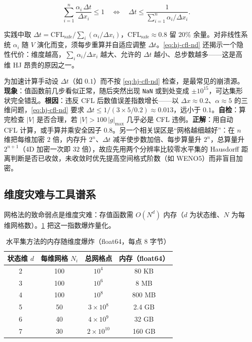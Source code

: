 \begin{equation}
  \boxed{\ \sum_{i=1}^{n}\frac{\alpha_i\,\Delta t}{\Delta x_i}\le1\quad\Longleftrightarrow\quad \Delta t\le\frac{1}{\sum_{i=1}^{n}\alpha_i/\Delta x_i}.\ }
  \label{eq:hj-cfl-nd}
\end{equation}

实践中取 $\Delta t=\mathrm{CFL}_{\mathrm{safe}}\big/\sum_i(\alpha_i/\Delta x_i)$，$\mathrm{CFL}_{\mathrm{safe}}\approx0.8$ 留 $20\%$ 余量。对非线性系统 $\alpha_i$ 随 $V$ 演化而变，须每步重算并自适应调整 $\Delta t$。\cref{eq:hj-cfl-nd} 还揭示一个隐性代价：维度越高，$\sum_i\alpha_i/\Delta x_i$ 越大、允许的 $\Delta t$ 越小、总步数越多——这是高维 HJ 昂贵的原因之一。

\begin{pitfall}
为加速计算手动设 $\Delta t$（如 $0.1$）而不按 \cref{eq:hj-cfl-nd} 检查，是最常见的崩溃源。\textbf{现象}：值函数前几步看似正常，随后突然出现 \texttt{NaN} 或到处变成 $\pm10^{15}$，可达集形状完全错乱。\textbf{根因}：违反 CFL 后数值误差指数增长——以 $\Delta x\approx0.2$、$\alpha\approx5$ 的三维问题，\cref{eq:hj-cfl-nd} 要求 $\Delta t\le1/(3\times5/0.2)\approx0.013$，远小于 $0.1$。\textbf{自检}：算完检查 $|V|$ 是否合理，若 $|V|>100\,|g|_{\max}$ 几乎必是 CFL 违例。\textbf{正解}：用自动 CFL 计算，或手算并乘安全因子 $0.8$。另一个相关误区是“网格越细越好”：在 $n$ 维把每维加密 $2$ 倍，内存升 $2^n$、$\Delta t$ 减半使步数加倍、每步算量升 $2^n$，总算量升 $2^{n+1}$（4D 加密一次即 $32$ 倍），故应先用两个分辨率比较零水平集的 Hausdorff 距离判断是否已收敛，未收敛时优先提高空间格式阶数（如 WENO5）而非盲目加密。
\end{pitfall}

\subsection{维度灾难与工具谱系}
\label{sec:hj-curse}

网格法的致命弱点是维度灾难：存值函数需 $O(N^d)$ 内存（$d$ 为状态维、$N$ 为每维网格数）。\cref{tab:hj-curse} 把这一指数爆炸量化。

\begin{table}[H]\centering\small
\caption{水平集方法的内存随维度爆炸（float64，每点 8 字节）}
\label{tab:hj-curse}
\begin{tabular}{cccc}
\toprule
状态维 $d$ & 每维网格 $N_i$ & 总网格点 & 内存（float64） \\
\midrule
2 & 100 & $10^{4}$ & 80 KB \\
3 & 100 & $10^{6}$ & 8 MB \\
4 & 100 & $10^{8}$ & 800 MB \\
5 & 50 & $3\times10^{8}$ & 2.4 GB \\
6 & 40 & $4\times10^{9}$ & 32 GB \\
7 & 30 & $2\times10^{10}$ & 160 GB \\
\bottomrule
\end{tabular}
\end{table}

